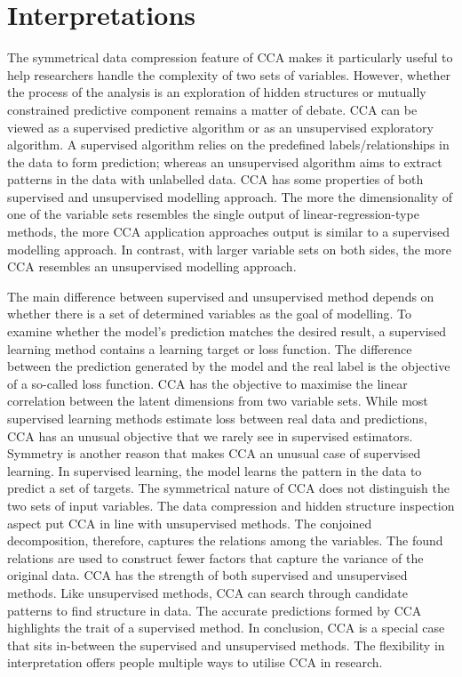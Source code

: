 \section{Interpretations}
\label{ch:methods:interpretations}
The symmetrical data compression feature of CCA makes it particularly useful to help researchers handle the complexity of two sets of variables. However, whether the process of the analysis is an exploration of hidden structures or mutually constrained predictive component remains a matter of debate. CCA can be viewed as a supervised predictive algorithm or as an unsupervised exploratory algorithm. A supervised algorithm relies on the predefined labels/relationships in the data to form prediction; whereas an unsupervised algorithm aims to extract patterns in the data with unlabelled data. CCA has some properties of both supervised and unsupervised modelling approach. The more the dimensionality of one of the variable sets resembles the single output of linear-regression-type methods, the more CCA application approaches output is similar to a supervised modelling approach. In contrast, with larger variable sets on both sides, the more CCA resembles an unsupervised modelling approach.

The main difference between supervised and unsupervised method depends on whether there is a set of determined variables as the goal of modelling. To examine whether the model’s prediction matches the desired result, a supervised learning method contains  a learning target or loss function. The difference between the prediction generated by the model and the real label is the objective of a so-called loss function. CCA has the objective to maximise the linear correlation between the latent dimensions from two variable sets. While most supervised learning methods estimate loss between real data and predictions, CCA has an unusual objective that we rarely see in supervised estimators.  Symmetry is another reason that makes CCA an unusual case of supervised learning. In supervised learning, the model learns the pattern in the data to predict a set of targets. The symmetrical nature of CCA does not distinguish the two sets of input variables. The data compression and hidden structure inspection aspect put CCA in line with unsupervised methods. The conjoined decomposition, therefore, captures the relations among the variables. The found relations are used to construct fewer factors that capture the variance of the original data. CCA has the strength of both supervised and unsupervised methods. Like unsupervised methods, CCA can search through candidate patterns to find structure in data. The accurate predictions formed by CCA highlights the trait of a supervised method. In conclusion, CCA is a special case that sits in-between the supervised and unsupervised methods. The flexibility in interpretation offers people multiple ways to utilise CCA in research.

